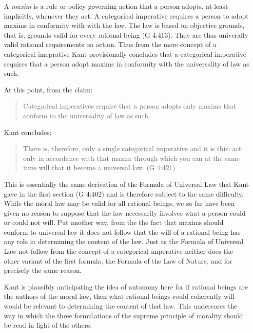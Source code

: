 A \emph{maxim} is a rule or policy governing action that a person adopts, at least implicitly, whenever they act. A categorical imperative requires a person to adopt maxims in conformity with with the law. The law is based on objective grounds, that is, grounds valid for every rational being (G 4:413). They are thus univerally valid rational requirements on action. Thus from the mere concept of a categorical imeprative Kant provisionally concludes that a categorical imperative requires that a person adopt maxims in conformity with the universality of law as such. \change

At this point, from the claim:

\begin{quote}
	Categorical imperatives require that a person adopts only maxims that conform to the universality of law as such.
\end{quote}

Kant concludes:

\begin{quote}
	There is, therefore, only a single categorical imperative and it is this: act only in accordance with that maxim through which you can at the same time will that it become a universal law. (G 4:421)
\end{quote}

This is essentially the same derivation of the Formula of Universal Law that Kant gave in the first section (G 4:402) and is therefore subject to the same difficulty. While the moral law may be valid for all rational beings, we so far have been given no reason to suppose that the law necessarily involves what a person could or could not will. Put another way, from the the fact that maxims should conform to universal law it does not follow that the will of a rational being has any role in determining the content of the law. Just as the Formula of Universal Law not follow from the concept of a categorical imperative neither does the other variant of the first formula, the Formula of the Law of Nature, and for precisely the same reason.

Kant is plausibly anticipating the idea of autonomy here for if rational beings are the authors of the moral law, then what rational beings could coherently will would be relevant to determining the content of that law. This undercores the way in which the three formulations of the supreme principle of morality should be read in light of the others. \change

